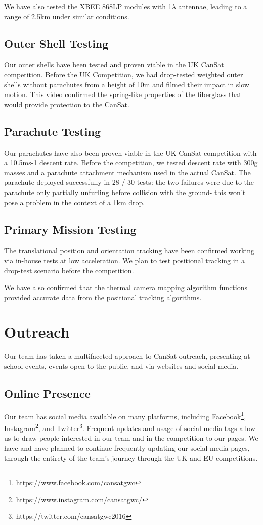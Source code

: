 \documentclass[]{report}
\begin{document}
We have also tested the XBEE 868LP modules with 1$\lambda$ antennae, leading to a range of 2.5km under similar conditions.
\subsection{Outer Shell Testing}
Our outer shells have been tested and proven viable in the UK CanSat competition. Before the UK Competition, we had drop-tested weighted outer shells without parachutes from a height of 10m and filmed their impact in slow motion. This video confirmed the spring-like properties of the fiberglass that would provide protection to the CanSat.
\subsection{Parachute Testing}
Our parachutes have also been proven viable in the UK CanSat competition with a 10.5ms-1 descent rate. Before the competition, we tested descent rate with 300g masses and a parachute attachment mechanism used in the actual CanSat. The parachute deployed successfully in 28 / 30 tests: the two failures were due to the parachute only partially unfurling before collision with the ground- this won't pose a problem in the context of a 1km drop.
\subsection{Primary Mission Testing}
The translational position and orientation tracking have been confirmed working via in-house tests at low acceleration. We plan to test positional tracking in a drop-test scenario before the competition. 

We have also confirmed that the thermal camera mapping algorithm functions provided accurate data from the positional tracking algorithms.
\section{Outreach}
Our team has taken a multifaceted approach to CanSat outreach, presenting at school events, events open to the public, and via websites and social media.
\subsection{Online Presence}
Our team has social media available on many platforms, including Facebook\footnote{https://www.facebook.com/cansatgwc}, Instagram\footnote{https://www.instagram.com/cansatgwc/}, and Twitter\footnote{https://twitter.com/cansatgwc2016}. Frequent updates and usage of social media tags allow us to draw people interested in our team and in the competition to our pages. We have and have planned to continue frequently updating our social media pages, through the entirety of the team's journey through the UK and EU competitions.
\end{document}
